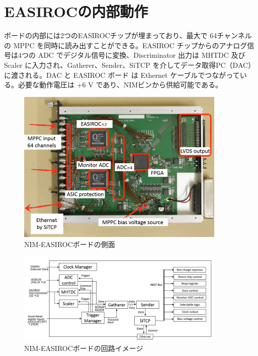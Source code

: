 \documentclass{jsarticle}
\begin{document}
\section{EASIROCの内部動作}
ボードの内部には2つのEASIROCチップが埋まっており、最大で 64チャンネルの MPPC を同時に読み出すことができる。EASIROC チップからのアナログ信号は4つの ADC でデジタル信号に変換、Discriminator 出力は MHTDC 及び Scaler に入力され、Gatherer、Sender、SiTCP を介してデータ取得PC（DAC）に渡される。DAC と EASIROC ボード は Ethernet ケーブルでつながっている。必要な動作電圧は +6 V であり、NIMビンから供給可能である。
\begin{figure}[H]
\begin{center}
\includegraphics[width = 10.0cm, bb= 0 0 735 544]{2.png}
\end{center}
\caption{NIM-EASIROCボードの側面}
\label{fig:}
\end{figure}

\begin{figure}[H]
\begin{center}
\includegraphics[width = 10.0cm, bb= 0 0 952 424]{3.png}
\end{center}
\caption{NIM-EASIROCボードの回路イメージ}
\label{fig:}
\end{figure}
\end{document}
